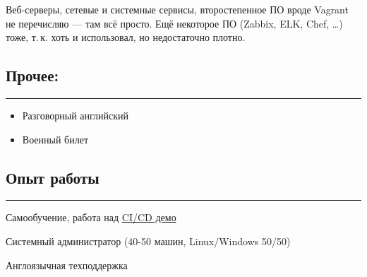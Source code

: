 \documentclass[11pt, a4paper]{article}
\newcommand{\Delimitline}{
  \vspace{-4ex}
  \textcolor[RGB]{120,120,120}{\rule{\linewidth}{1pt}}
  \vspace{-4ex}
}
\newcommand\Eng[1]{%
  \foreignlanguage{english}{#1}%
}
\begin{document}
Веб-серверы, сетевые и системные сервисы, второстепенное ПО вроде \Eng{Vagrant} не перечисляю — там всё просто. Ещё некоторое ПО \Eng{(Zabbix, ELK, Chef, \dots)} тоже, т.\,к. хоть и использовал, но недостаточно плотно.

\subsection*{Прочее:}
\Delimitline
\begin{itemize}
  \item Разговорный английский
  \item Военный билет
\end{itemize}

\subsection*{Опыт работы}
\Delimitline
\begin{etaremune}
  \item Самообучение, работа над \href{https://github.com/bititanb/CI-CD-pipeline}{\Eng{CI/CD} демо}
  \item Системный администратор (40-50 машин, \Eng{Linux/Windows} 50/50)
  \item Англоязычная техподдержка
\end{etaremune}
\end{document}

